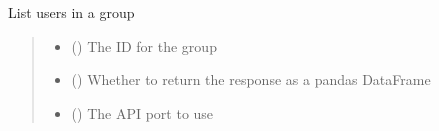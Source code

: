 \documentclass[letterpaper,10pt,english]{sphinxmanual}
\begin{document}
\begin{fulllineitems}
\begin{fulllineitems}
\label{\detokenize{aisquared.platform:aisquared.platform.AISquaredPlatformClient.AISquaredPlatformClient.list_group_users}}
\pysigstartsignatures
{}
\pysigstopsignatures
\sphinxAtStartPar
List users in a group

\begin{sphinxVerbatim}[commandchars=\\\{\}]
 
  
\end{sphinxVerbatim}
\begin{quote}\begin{description}
\begin{itemize}
\item {} 
\sphinxAtStartPar
{} () \textendash{} The ID for the group

\item {} 
\sphinxAtStartPar
{} (\sphinxstyleliteralemphasis{\sphinxupquote{ (}}\sphinxstyleliteralemphasis{\sphinxupquote{)}}) \textendash{} Whether to return the response as a pandas DataFrame

\item {} 
\sphinxAtStartPar
{} (\sphinxstyleliteralemphasis{\sphinxupquote{ (}}\sphinxstyleliteralemphasis{\sphinxupquote{)}}) \textendash{} The API port to use


\end{itemize}
\end{description}
\end{quote}
\end{fulllineitems}
\end{fulllineitems}
\end{document}
